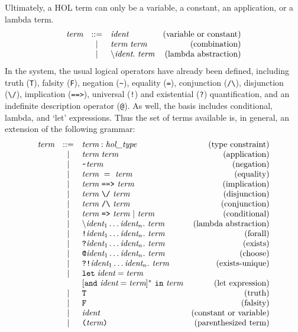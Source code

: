 \documentclass[12pt,fleqn,layout,a4paper]{report}
\makeatletter
\newcommand{\ident}      {\mbox{\it ident}}
\newcommand{\type}       {\mbox{\it hol\_type}}
\newcommand{\term}       {\mbox{\it term}}
\newcommand{\bs}         {\mbox{$\backslash$}}
\newcommand{\IMP}       {\mbox{\tt ==>}}
\newcommand{\LET}       {\mbox{\tt let}}
\newcommand{\IN}       {\mbox{\tt in}}
\newcommand{\und}       {\mbox{\tt and}}
\newcommand{\ALL}       {\mbox{\tt !}}
\newcommand{\EXISTS}       {\mbox{\tt ?}}
\newcommand{\EXISTSONE}       {\mbox{\tt ?!}}
\newcommand{\CHOOSE}       {\mbox{\tt @}}
\makeatother
\begin{document}
 Ultimately, a HOL term can only be a variable, a constant, an
 application, or a lambda term.
 \[
 \begin{array}{rclr}
  \term & ::= & \ident & \mbox{(variable or constant)} \\
     & | &  \term\  \term & \mbox{(combination)} \\
     & | &  \bs\ident.\  \term &
 \mbox{(lambda abstraction)}
 \end{array}
 \]
In the system, the usual logical operators have already been defined,
 including truth (\verb+T+), falsity (\verb+F+), negation (\verb+~+),
 equality (\verb+=+), conjunction (\verb+/\+), disjunction (\verb+\/+),
 implication (\verb+==>+), universal (\verb+!+) and existential
 (\verb+?+)  quantification, and an indefinite description operator
 (\verb+@+). As well, the basis includes conditional, lambda, and `let'
 expressions. Thus the set of terms available is, in general, an extension
 of the following grammar:
 \[
 \begin{array}{rclr}
  \mbox{\it term} & ::= & \term : \type & \mbox{(type constraint)} \\
  & | & \term\ \term & \mbox{(application)} \\
  & | & \verb+~+ \term & \mbox{(negation)} \\
  & | & \term\ =\ \term & \mbox{(equality)} \\
  & | & \term\ \IMP\ \term & \mbox{(implication)} \\
  & | & \term\ \verb+\/+\ \term & \mbox{(disjunction)} \\
  & | & \term\ \verb+/\+\ \term & \mbox{(conjunction)} \\
  & | & \term\ \verb+=>+\ \term\ |\ \term & \mbox{(conditional)} \\
  & | & \bs\ident_1\ldots\ident_n.\  \term & \mbox{(lambda abstraction)} \\
  & | & \ALL \ident_1\ldots\ident_n.\ \term & \mbox{(forall)} \\
  & | & \EXISTS \ident_1\ldots\ident_n.\ \term & \mbox{(exists)} \\
  & | & \CHOOSE \ident_1\ldots\ident_n.\ \term & \mbox{(choose)} \\
  & | & \EXISTSONE \ident_1\ldots\ident_n.\ \term &\mbox{(exists-unique)} \\
  & | & \LET\; \ident = \term  & \\
  &   & [\und\ \ident = \term]^{*}\ \IN\ \term & \mbox{(let expression)} \\
  & | & \verb+T+ & \mbox{(truth)} \\
  & | & \verb+F+ & \mbox{(falsity)} \\
  & | & \ident & \mbox{(constant or variable)} \\
  & | & \verb+(+ \term \verb+)+ & \mbox{(parenthesized term)}
 \end{array}
 \]
\end{document}
